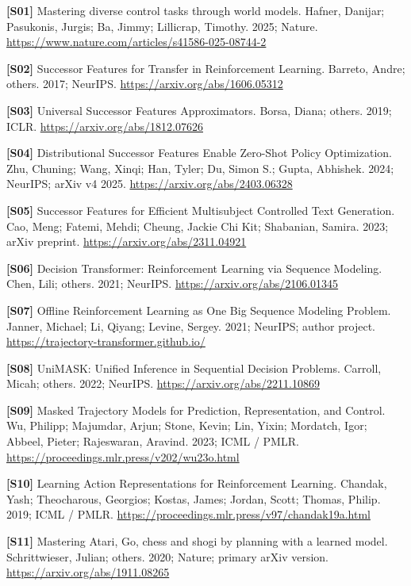 \documentclass[
  11pt,
  a4paper,
]{article}
\begin{document}
\textbf{{[}S01{]}} Mastering diverse control tasks through world models.
Hafner, Danijar; Pasukonis, Jurgis; Ba, Jimmy; Lillicrap, Timothy. 2025;
Nature. \url{https://www.nature.com/articles/s41586-025-08744-2}

\textbf{{[}S02{]}} Successor Features for Transfer in Reinforcement
Learning. Barreto, Andre; others. 2017; NeurIPS.
\url{https://arxiv.org/abs/1606.05312}

\textbf{{[}S03{]}} Universal Successor Features Approximators. Borsa,
Diana; others. 2019; ICLR. \url{https://arxiv.org/abs/1812.07626}

\textbf{{[}S04{]}} Distributional Successor Features Enable Zero-Shot
Policy Optimization. Zhu, Chuning; Wang, Xinqi; Han, Tyler; Du, Simon
S.; Gupta, Abhishek. 2024; NeurIPS; arXiv v4 2025.
\url{https://arxiv.org/abs/2403.06328}

\textbf{{[}S05{]}} Successor Features for Efficient Multisubject
Controlled Text Generation. Cao, Meng; Fatemi, Mehdi; Cheung, Jackie Chi
Kit; Shabanian, Samira. 2023; arXiv preprint.
\url{https://arxiv.org/abs/2311.04921}

\textbf{{[}S06{]}} Decision Transformer: Reinforcement Learning via
Sequence Modeling. Chen, Lili; others. 2021; NeurIPS.
\url{https://arxiv.org/abs/2106.01345}

\textbf{{[}S07{]}} Offline Reinforcement Learning as One Big Sequence
Modeling Problem. Janner, Michael; Li, Qiyang; Levine, Sergey. 2021;
NeurIPS; author project. \url{https://trajectory-transformer.github.io/}

\textbf{{[}S08{]}} UniMASK: Unified Inference in Sequential Decision
Problems. Carroll, Micah; others. 2022; NeurIPS.
\url{https://arxiv.org/abs/2211.10869}

\textbf{{[}S09{]}} Masked Trajectory Models for Prediction,
Representation, and Control. Wu, Philipp; Majumdar, Arjun; Stone, Kevin;
Lin, Yixin; Mordatch, Igor; Abbeel, Pieter; Rajeswaran, Aravind. 2023;
ICML / PMLR. \url{https://proceedings.mlr.press/v202/wu23o.html}

\textbf{{[}S10{]}} Learning Action Representations for Reinforcement
Learning. Chandak, Yash; Theocharous, Georgios; Kostas, James; Jordan,
Scott; Thomas, Philip. 2019; ICML / PMLR.
\url{https://proceedings.mlr.press/v97/chandak19a.html}

\textbf{{[}S11{]}} Mastering Atari, Go, chess and shogi by planning with
a learned model. Schrittwieser, Julian; others. 2020; Nature; primary
arXiv version. \url{https://arxiv.org/abs/1911.08265}
\end{document}
